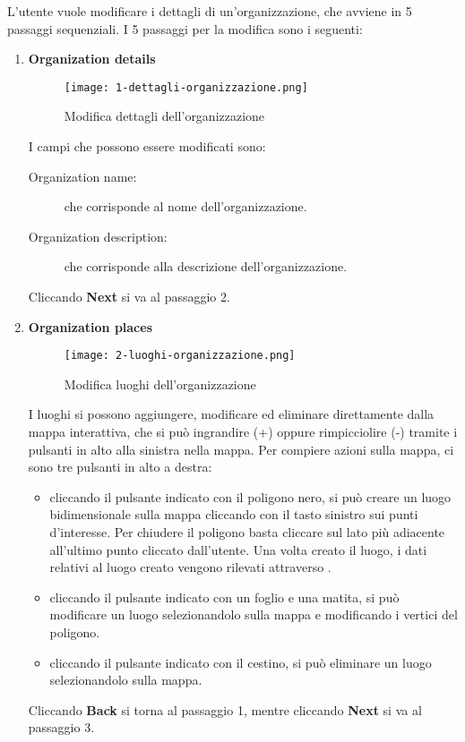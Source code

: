 \documentclass[../manuale-utente.tex]{subfiles}
\begin{document}
L'utente vuole modificare i dettagli di un'organizzazione, che avviene in 5 passaggi sequenziali.
I 5 passaggi per la modifica sono i seguenti:
\begin{enumerate}
    \item \textbf{Organization details}

    \begin{figure}[H]
        \centering
        \texttt{[image: 1-dettagli-organizzazione.png]}
        \caption{Modifica dettagli dell'organizzazione}%
        \label{fig:web_app_modifica_dettagli_organizzazione}
    \end{figure}
    I campi che possono essere modificati sono:
    \begin{description}
        \item[Organization name:] che corrisponde al nome dell'organizzazione.
        \item[Organization description:] che corrisponde alla descrizione dell'organizzazione.
    \end{description}
    Cliccando \textbf{Next} si va al passaggio 2.

    \item \textbf{Organization places}

    \begin{figure}[H]
        \centering
        \texttt{[image: 2-luoghi-organizzazione.png]}
        \caption{Modifica luoghi dell'organizzazione}%
        \label{fig:web_app_modifica_luoghi_organizzazione}
    \end{figure}
    I luoghi si possono aggiungere, modificare ed eliminare direttamente dalla mappa interattiva, che si può ingrandire (+) oppure rimpicciolire (-) tramite i pulsanti in alto alla sinistra nella mappa.
    Per compiere azioni sulla mappa, ci sono tre pulsanti in alto a destra:
    \begin{itemize}
        \item cliccando il pulsante indicato con il poligono nero, si può creare un luogo bidimensionale sulla mappa cliccando con il tasto sinistro sui punti d'interesse. Per chiudere il poligono basta cliccare sul lato più adiacente all'ultimo punto cliccato dall'utente. Una volta creato il luogo, i dati relativi al luogo creato vengono rilevati attraverso .
        \item cliccando il pulsante indicato con un foglio e una matita, si può modificare un luogo selezionandolo sulla mappa e modificando i vertici del poligono.
        \item cliccando il pulsante indicato con il cestino, si può eliminare un luogo selezionandolo sulla mappa.
    \end{itemize}
    Cliccando \textbf{Back} si torna al passaggio 1, mentre cliccando \textbf{Next} si va al passaggio 3.


\end{enumerate}
\end{document}
